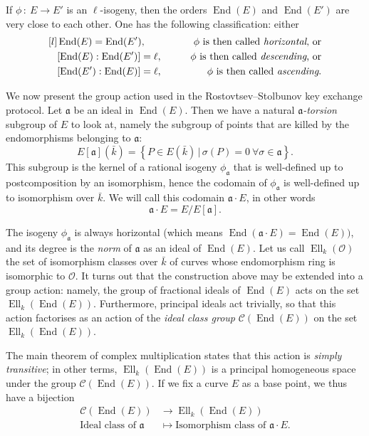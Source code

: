 \documentclass{article}
\newcommand{\Cl}{\mathcal{C}}
\renewcommand{\O}{\mathcal{O}}
\newcommand{\from}{\ensuremath{\,:\ }}
\newcommand{\set}[1]{\left\{#1\right\}}
\newcommand{\suchthat}{\,|\,}
\renewcommand{\frak}{\mathfrak}
\theoremstyle{definition}
\DeclareMathOperator{\End}{End}
\DeclareMathOperator{\Ell}{Ell}
\begin{document}
If $\phi\from E\to E'$ is an $\ell$-isogeny, then the orders $\End(E)$ and $\End
(E')$ are very close to each other. One has the following classification: either
\[
\begin{aligned}[l]
&\End(E) = \End(E'),
&\qquad\text{$\phi$ is then called \emph{horizontal}, or} &\\
&[\End(E):\End(E')] = \ell,
&\qquad\text{$\phi$ is then called \emph{descending}, or} &\\
&[\End(E'):\End(E)] = \ell,
&\qquad\text{$\phi$ is then called \emph{ascending}.} &
\end{aligned}
\]

We now present the group action used in the Rostovtsev--Stolbunov key exchange 
protocol. Let $\frak a$ be an ideal in $\End(E)$. Then we have a natural \emph
{${\frak a}$-torsion} subgroup of $E$ to look at, namely the subgroup of points
that are killed by the endomorphisms belonging to $\frak a$:
\[
E[\frak a](\bar{k}) = \set{P\in E(\bar{k}) \suchthat \sigma(P) = 0\ 
\forall\sigma\in\frak a}.
\]
This subgroup is the kernel of a rational isogeny $\phi_{\frak a}$ that is
well-defined up to postcomposition by an isomorphism, hence the codomain of
$\phi_{\frak a}$ is well-defined up to isomorphism over $\bar{k}$.
We will call this 
codomain $\frak a\cdot E$, in other words
\[
\frak a\cdot E = E/E[\frak a].
\]

The isogeny $\phi_{\frak a}$ is always horizontal (which means $\End(\frak a
\cdot E) = \End(E))$, and its degree is the \emph{norm} of $\frak a$ as an ideal 
of $\End(E)$.
Let us call $\Ell_k(\O)$ the set of isomorphism classes over $\bar{k}$ of 
curves whose endomorphism ring is isomorphic to $\O$. It turns out that the 
construction above may be extended into a group action: namely, the group of 
fractional ideals of $\End(E)$ acts on the set $\Ell_k(\End(E))$. Furthermore, 
principal ideals act trivially, so that this action factorises as an action of 
the \emph{ideal class group} $\Cl(\End(E))$ on the set $\Ell_k(\End(E))$.

The main theorem of complex multiplication \cite{} states that this action is \emph{
simply transitive}; in other terms, $\Ell_k(\End(E))$ is a principal 
homogeneous space under the group $\Cl(\End(E))$. If we fix a curve $E$ as a 
base point, we thus have a bijection
\[
\begin{aligned}
\Cl(\End(E)) &\to \Ell_k(\End(E)) \\
\text{Ideal class of }\frak a &\mapsto \text{Isomorphism class of }\frak a\cdot E.
\end{aligned}
\]
\end{document}
